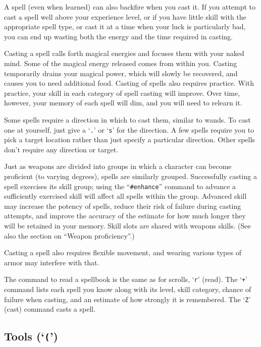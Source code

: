 A spell (even when learned) can also backfire when you cast it.  If you
attempt to cast a spell well above your experience level, or if you have
little skill with the appropriate spell type, or cast it at
a time when your luck is particularly bad, you can end up wasting both the
energy and the time required in casting.

Casting a spell calls forth magical energies and focuses them with
your naked mind.  Some of the magical energy released comes from within
you.
Casting temporarily drains your magical power, which will slowly be
recovered, and causes you to need additional food.
Casting of spells also requires practice.  With practice, your
skill in each category of spell casting will improve.  Over time, however,
your memory of each spell will dim, and you will need to relearn it.

Some spells require a direction in which to cast them, similar to wands.
To cast one at yourself, just give a `{\tt .}' or `{\tt s}' for the direction.
A few spells require you to pick a target location rather than just specify
a particular direction.
Other spells don't require any direction or target.

Just as weapons are divided into groups in which a character can become
proficient (to varying degrees), spells are similarly grouped.
Successfully casting a spell exercises its skill group; using the
``{\tt \#enhance}'' command to advance a sufficiently exercised skill
will affect all spells within the group.  Advanced skill may increase the
potency of spells, reduce their risk of failure during casting attempts,
and improve the accuracy of the estimate for how much longer they will
be retained in your memory.
Skill slots are shared with weapons skills.  (See also the section on
``Weapon proficiency''.)

Casting a spell also requires flexible movement, and wearing various types
of armor may interfere with that.

The command to read a spellbook is the same as for scrolls, `{\tt r}' (read).
The `{\tt +}' command lists each spell you know along with its level, skill
category, chance of failure when casting, and an estimate of how strongly
it is remembered.
The `{\tt Z}' (cast) command casts a spell.

\subsection*{Tools (`{\tt (}')}

